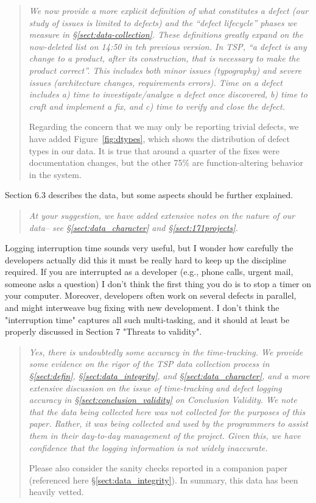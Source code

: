 \documentclass[smallcondensed]{svjour3}
\newcommand{\tion}[1]{\S\ref{sect:#1}}
\newcommand{\fig}[1]{Figure~\ref{fig:#1}}
\begin{document}
\begin{quote} {\em
We now provide a more explicit definition of what constitutes a defect (our study of issues is limited to defects) and the ``defect lifecycle'' phases we measure in \tion{data-collection}. These definitions greatly expand on the now-deleted list on 14:50 in teh previous version. In TSP, ``a defect is any change to a product, after its construction, that is necessary to make the product correct''. This includes both minor issues (typography) and severe issues (architecture changes, requirements errors). Time on a defect includes a) time to investigate/analyze a defect once discovered, b) time to craft and implement a fix, and c) time to verify and close the defect.

Regarding the concern that we may only be reporting trivial defects, we have added \fig{dtypes}, which shows the distribution of defect types in our data. It is true that around a quarter of the fixes were documentation changes, but the other 75\% are function-altering behavior in the system. 
}\end{quote}


Section 6.3 describes the data, but some aspects
should be further explained.

\begin{quote} {\em
At your suggestion, we have added extensive notes on the nature of our data--
see \tion{data_character} and \tion{171projects}.
}\end{quote}


Logging interruption time
sounds very useful, but I wonder how carefully the
developers actually did this 
 it must be really hard to keep up the discipline required.
 If you are interrupted as a developer (e.g., phone calls,
 urgent mail, someone asks a question) I don't think the
 first thing you do is to stop a timer on your computer.
 Moreover, developers often work on several defects in
 parallel, and might interweave bug fixing with new
 development. I don't think the "interruption time" captures
 all such multi-tasking, and it should at least be properly
 discussed in Section 7 "Threats to validity".

\begin{quote}{\em 
Yes, there is undoubtedly some accuracy in the time-tracking. We provide some evidence on the rigor of the TSP data collection process in \tion{defin}, \tion{data_integrity}, and \tion{data_character}, and a more extensive discussion on the issue of time-tracking and defect logging accuracy in \tion{conclusion_validity} on Conclusion Validity. We note that the data being collected here was not collected
for the purposes of this paper. Rather, it was being collected and used by the
programmers to assist them in their day-to-day management of the project.
Given this, we have confidence that the logging information is not widely inaccurate.

Please also consider the sanity checks reported in a companion paper (referenced here \tion{data_integrity}). In summary, this data has been heavily vetted.
}
\end{quote}
\end{document}
